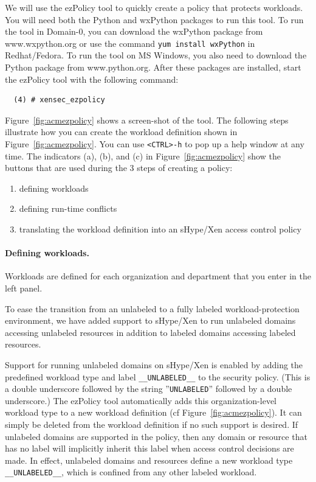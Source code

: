 \documentclass[11pt,twoside,final,openright]{report}
\begin{document}
We will use the ezPolicy tool to quickly create a policy that protects
workloads.  You will need both the Python and wxPython packages to run
this tool.  To run the tool in Domain-0, you can download the wxPython
package from www.wxpython.org or use the command \verb|yum install wxPython|
in Redhat/Fedora. To run the tool on MS Windows, you also need to download
the Python package from www.python.org. After these packages are installed,
start the ezPolicy tool with the following command:

\begin{verbatim}
  (4) # xensec_ezpolicy
\end{verbatim}

Figure~\ref{fig:acmezpolicy} shows a screen-shot of the tool. The
following steps illustrate how you can create the workload definition
shown in Figure~\ref{fig:acmezpolicy}.  You can use \verb|<CTRL>-h| to
pop up a help window at any time. The indicators (a), (b), and (c) in
Figure~\ref{fig:acmezpolicy} show the buttons that are used during the
3 steps of creating a policy:
\begin{enumerate}
\item defining workloads
\item defining run-time conflicts
\item translating the workload definition into an sHype/Xen access
  control policy
\end{enumerate}

\paragraph{Defining workloads.} Workloads are defined for each
organization and department that you enter in the left panel.

To ease the transition from an unlabeled to a fully labeled workload-protection
environment, we have added support to sHype/Xen to run unlabeled domains accessing
unlabeled resources in addition to labeled domains accessing labeled resources.

Support for running unlabeled domains on sHype/Xen is enabled by adding the
predefined workload type and label \verb|__UNLABELED__| to the security
policy. (This is a double underscore
followed by the string ''\verb|UNLABELED|'' followed by a double underscore.)
The ezPolicy tool automatically adds this organization-level workload type
to a new workload definition (cf Figure~\ref{fig:acmezpolicy}). It can simply be
deleted from the workload definition if no such support is desired. If unlabeled domains
are supported in the policy, then any domain or resource that has no label will implicitly
inherit this label when access control decisions are made. In effect, unlabeled
domains and resources define a new workload type \verb|__UNLABELED__|, which is
confined from any other labeled workload.
\end{document}
